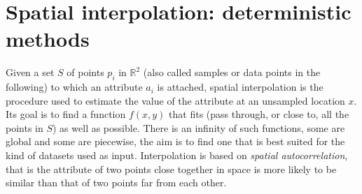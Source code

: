 
\setchapterpreamble[u]{\margintoc}
\chapter{Spatial interpolation: deterministic methods}%
\label{chap:interpol}



\graphicspath{{interpol/}}




Given a set $S$ of points $p_i$ in $\mathbb{R}^2$ (also called samples or data points in the following) to which an attribute $a_i$ is attached, spatial interpolation is the procedure used to estimate the value of the attribute at an unsampled location $x$. 
Its goal is to find a function $f(x,y)$ that fits (pass through, or close to, all the points in $S$) as well as possible. 
There is an infinity of such functions, some are global and some are piecewise, the aim is to find one that is best suited for the kind of datasets used as input.
Interpolation is based on \emph{spatial autocorrelation}, that is the attribute of two points close together in space is more likely to be similar than that of two points far from each other.

%

